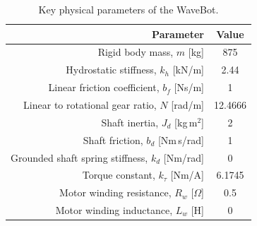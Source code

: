 \documentclass[twocolumn]{autart}
\begin{document}
\begin{table}[tb]
        \caption{Key physical parameters of the WaveBot.}
        \label{tab:wec_physical_params}
        \centering

        \begin{tabular}{rc}
        \hline

        \hline
        \textbf{Parameter} & \textbf{Value} \\
        \hline
        Rigid body mass, $m$ [kg]                       & 875 \\
        Hydrostatic stiffness, $k_h$ [kN/m]             & 2.44 \\
        Linear friction coefficient, $b_f$ [Ns/m]       & 1 \\ %
        Linear to rotational gear ratio, $N$ [rad/m]    & 12.4666 \\
        Shaft inertia, $J_d$ [kg\,m$^2$]                & 2 \\ %
        Shaft friction, $b_d$ [Nm\,s/rad]               & 1 \\ %
        Grounded shaft spring stiffness, $k_d$ [Nm/rad] & 0 \\ %
        Torque constant, $k_\tau$ [Nm/A]                & 6.1745 \\
        Motor winding resistance, $R_w$ [$\Omega$]      & 0.5 \\
        Motor winding inductance, $L_w$ [H]             & 0 \\
        \hline

        \hline
        \end{tabular}
\end{table}

\end{document}
